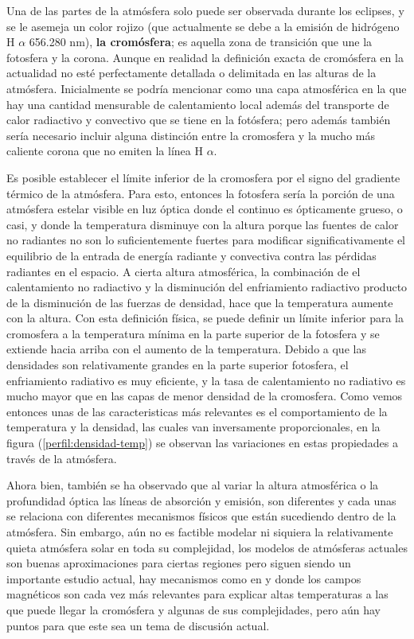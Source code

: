 \documentclass[12pt,oneside,openany,letter]{book}
\begin{document}
\noindent Una de las partes de la atmósfera solo puede ser observada durante los eclipses, y se le asemeja un color rojizo (que actualmente se debe a la emisión de hidrógeno H $\alpha$ 656.280 nm), \textbf{la cromósfera}; es aquella zona de transición que une la fotosfera y la corona.  Aunque en realidad la definición exacta de cromósfera en la actualidad no esté perfectamente detallada o delimitada en las alturas de la atmósfera. Inicialmente se podría mencionar como una capa atmosférica en la que hay una cantidad mensurable de calentamiento local además del transporte de calor radiactivo y convectivo que se tiene en la fotósfera; pero además también sería necesario incluir alguna distinción entre la cromosfera y la mucho más caliente corona que no emiten la línea H $\alpha$. 

Es posible establecer el límite inferior de la cromosfera por el signo del gradiente térmico de la atmósfera. Para esto, entonces la fotosfera sería la porción de una atmósfera estelar visible en luz óptica donde el continuo es ópticamente grueso, o casi, y donde la temperatura disminuye con la altura porque las fuentes de calor no radiantes no son lo suficientemente fuertes para modificar significativamente el equilibrio de la entrada de energía radiante y convectiva contra las pérdidas radiantes en el espacio. A cierta altura atmosférica, la combinación de el calentamiento no radiactivo y la disminución del enfriamiento radiactivo producto de la disminución de las fuerzas de densidad, hace que la temperatura aumente con la altura. Con esta definición física, se puede definir un límite inferior para la cromosfera a la temperatura mínima en la parte superior de la fotosfera y se extiende hacia arriba con el aumento de la temperatura. Debido a que las densidades son relativamente grandes en la parte superior fotosfera, el enfriamiento radiativo es muy eficiente, y la tasa de calentamiento no radiativo es mucho mayor que en las capas de menor densidad de la cromosfera. Como vemos entonces unas de las caracteristicas más relevantes es el comportamiento de la temperatura y la densidad, las cuales van inversamente proporcionales, en la figura (\ref{perfil:densidad-temp}) se observan las variaciones en estas propiedades a través de la atmósfera. 


Ahora bien, también se ha observado que al variar la altura atmosférica o la profundidad óptica las líneas de absorción y emisión, son diferentes y cada unas se relaciona con diferentes mecanismos físicos que están sucediendo dentro de la atmósfera. Sin embargo, aún no es factible modelar ni siquiera la relativamente quieta atmósfera solar en toda su complejidad, los modelos de atmósferas actuales son buenas aproximaciones para ciertas regiones pero siguen siendo un importante estudio actual, hay mecanismos como en \citep{chavez2013new} y \citep{ayres2019stellar} donde  los campos magnéticos son cada vez más relevantes para explicar altas temperaturas a las que puede llegar la cromósfera y algunas de sus complejidades, pero aún hay puntos para que este sea un tema de discusión actual.
\end{document}

